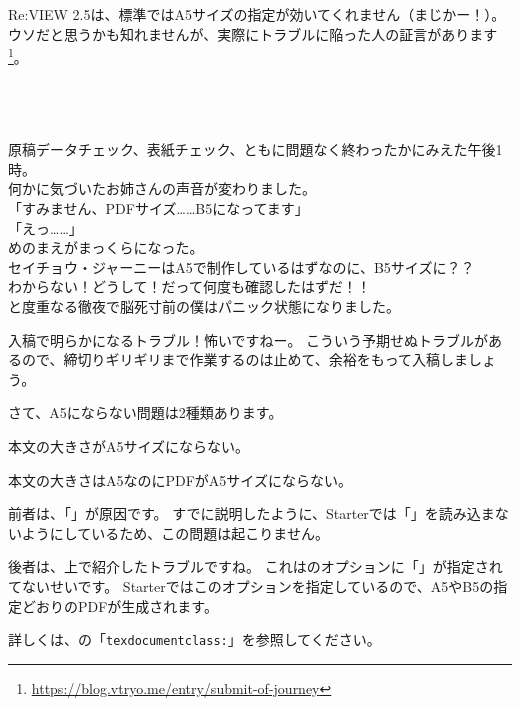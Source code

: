 Re:VIEW 2.5は、標準ではA5サイズの指定が効いてくれません（まじかー！）。
ウソだと思うかも知れませんが、実際にトラブルに陥った人の証言があります\footnote{\url{https://blog.vtryo.me/entry/submit-of-journey}}。

\begin{starterquote}

　\\{}
\\{}\\{}
原稿データチェック、表紙チェック、ともに問題なく終わったかにみえた午後1時。\\{}
何かに気づいたお姉さんの声音が変わりました。\\{}
「すみません、PDFサイズ……B5になってます」\\{}
「えっ……」\\{}
めのまえがまっくらになった。\\{}
セイチョウ・ジャーニーはA5で制作しているはずなのに、B5サイズに？？\\{}
わからない！どうして！だって何度も確認したはずだ！！\\{}
と度重なる徹夜で脳死寸前の僕はパニック状態になりました。\\{}

\end{starterquote}

入稿で明らかになるトラブル！怖いですねー。
こういう予期せぬトラブルがあるので、締切りギリギリまで作業するのは止めて、余裕をもって入稿しましょう。

さて、A5にならない問題は2種類あります。

\begin{starteritemize}
\item 本文の大きさがA5サイズにならない。
\item 本文の大きさはA5なのにPDFがA5サイズにならない。
\end{starteritemize}

前者は、「」が原因です。
すでに説明したように、Starterでは「」を読み込まないようにしているため、この問題は起こりません。

後者は、上で紹介したトラブルですね。
これはのオプションに「」が指定されてないせいです。
Starterではこのオプションを指定しているので、A5やB5の指定どおりのPDFが生成されます。

詳しくは、の「\texttt{texdocumentclass:}」を参照してください。

\begin{starterprogram}\end{starterprogram}

